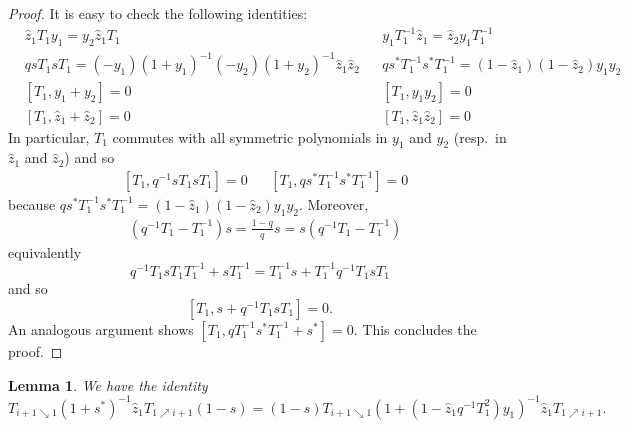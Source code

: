 \documentclass[reqno]{amsart}
\theoremstyle{plain}
\newtheorem{lemma}[theorem]{Lemma}
\theoremstyle{definition}
\theoremstyle{remark}
\newcommand{\z}{\widehat{z}}
\newcommand{\<}{\langle}
\renewcommand{\>}{\rangle}
\begin{document}
\begin{proof}
    It is easy to check the following identities:
    \begin{align}
        & \z_1 T_1 y_1 = y_2 \z_1 T_1 & & y_1 T_1^{-1} \z_1 = \z_2 y_1 T_1^{-1} \label{eq:z1_y1_comm} \\
        & q s T_1 s T_1 = (-y_1) (1+y_1)^{-1} (-y_2)(1+y_2)^{-1} \z_1 \z_2 & & q s^* T_1^{-1} s^* T_1^{-1} = (1 - \z_1) (1 - \z_2) y_1 y_2 \\
        & [T_1, y_1+y_2] = 0 & & [T_1, y_1 y_2] = 0 \label{eq:T1_symy_comm} \\
        & [T_1, \z_1+\z_2] = 0 & & [T_1, \z_1 \z_2] = 0 \label{eq:T1_symz_comm}
    \end{align}
    In particular, $T_1$ commutes with all symmetric polynomials in $y_1$ and $y_2$ (resp.\ in $\z_1$ and $\z_2$) and so 
    \begin{align*}
        & [T_1, q^{-1} s T_1 s T_1] = 0 &&  [T_1, q s^* T_1^{-1} s^* T_1^{-1}] = 0
    \end{align*}
    because $q s^* T_1^{-1} s^* T_1^{-1} = (1-\z_1)(1-\z_2)y_1y_2$.
    Moreover,
    \begin{align*}
        & (q^{-1}T_1-T_1^{-1})s = \frac{1-q}{q} s = s(q^{-1}T_1-T_1^{-1})
    \end{align*}
    equivalently
    \[q^{-1} T_1 s T_1 T_1^{-1} + s T_1^{-1} = T_1^{-1} s + T_1^{-1} q^{-1} T_1 s T_1 \]
    and so
    \[ [T_1, s + q^{-1} T_1 s T_1] = 0. \]
    An analogous argument shows $[T_1, q T_1^{-1} s^* T_1^{-1} + s^*] = 0$.
    This concludes the proof.
\end{proof}

\begin{lemma}
    \label{lemma:proof_Q1}
    We have the identity
    \[ T_{i+1 \searrow 1} (1+s^*)^{-1} \z_1 T_{1 \nearrow i+1} (1-s) = (1-s) T_{i+1 \searrow 1} \left( 1 + \left( 1 - \z_1 q^{-1} T^2_1 \right) y_1 \right)^{-1} \z_1 T_{1 \nearrow i+1}.\]
\end{lemma}
\end{document}

